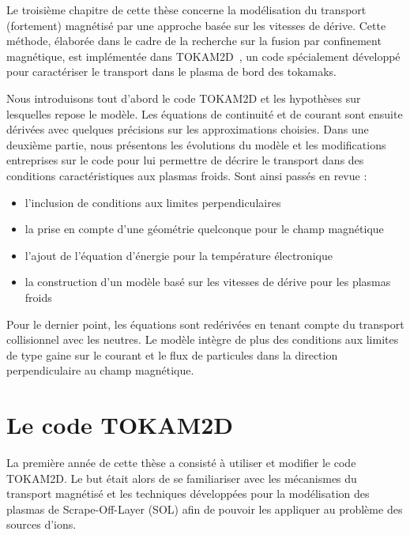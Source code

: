 \label{chapitre3}
\begin{refsection}
Le troisième chapitre de cette thèse concerne la modélisation du transport
(fortement) magnétisé par une approche basée sur les vitesses de dérive. Cette
méthode, élaborée dans le cadre de la recherche sur la fusion par
confinement magnétique, est implémentée dans TOKAM2D~\cite{Sarazin}, un code 
spécialement développé pour caractériser le transport dans le plasma de bord
des tokamaks.

Nous introduisons tout d'abord le code TOKAM2D et les hypothèses sur
lesquelles repose le modèle. Les équations de continuité et de
courant sont ensuite dérivées avec quelques précisions sur les approximations
choisies.
Dans une deuxième partie, nous présentons les évolutions du
modèle et les modifications entreprises sur le code pour lui
permettre de décrire le transport dans des conditions caractéristiques aux
plasmas froids. Sont ainsi passés en revue :

\begin{itemize}
  \item l'inclusion de conditions aux limites
perpendiculaires
\item la prise en compte d'une géométrie quelconque pour le champ magnétique
\item l'ajout de l'équation d'énergie pour la
température électronique
\item la construction d'un modèle basé sur les vitesses de dérive pour les plasmas froids
\end{itemize}

Pour le dernier point, les équations sont redérivées en tenant
compte du transport collisionnel avec les neutres. Le modèle intègre de plus des
conditions aux limites de type gaine sur le courant et le flux de particules
dans la direction perpendiculaire au champ magnétique.



\section{Le code TOKAM2D}

La première année de cette thèse a consisté à utiliser et modifier le
code {TOKAM2D}. Le but était alors de se familiariser avec les mécanismes du
transport magnétisé et les techniques développées pour la modélisation des
plasmas de Scrape-Off-Layer (SOL) afin
de pouvoir les appliquer au problème des sources d'ions. 


\end{refsection}
